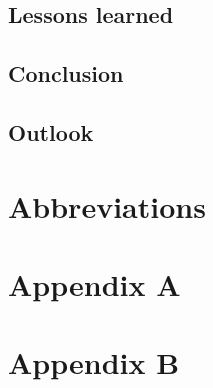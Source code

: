 \section{Lessons learned}\label{lessons_learned}

\section{Conclusion}\label{conclusion}

\section{Outlook}\label{outlook}

\chapter{Abbreviations}

\printbibliography

\chapter{Appendix A}\label{appendix a}

\chapter{Appendix B}\label{appendix b}
%


